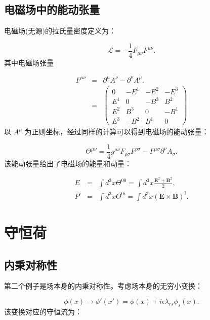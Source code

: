 \documentclass[10pt,UTF8]{ctexart}
\begin{document}
\subsection*{电磁场中的能动张量}
\noindent
电磁场(无源)的拉氏量密度定义为：

\begin{equation}
\mathcal{L}=-\frac{1}{4}F_{\mu\nu}F^{\mu\nu}.
\end{equation}
其中电磁场张量

\begin{eqnarray}
F^{\mu\nu} & = & \partial^{\mu}A^{\nu}-\partial^{\nu}A^{\mu}.\\
 & = & \left(\begin{array}{cccc}
0 & -E^{1} & -E^{2} & -E^{3}\\
E^{1} & 0 & -B^{3} & B^{2}\\
E^{2} & B^{3} & 0 & -B^{1}\\
E^{3} & -B^{2} & B^{1} & 0
\end{array}\right)
\end{eqnarray}
以 $A^{\mu}$ 为正则坐标，经过同样的计算可以得到电磁场的能动张量：

\begin{equation}
\Theta^{\mu\nu}=\frac{1}{4}g^{\mu\nu}F_{\rho\sigma}F^{\rho\sigma}-F^{\mu\sigma}\partial^{\nu}A_{\sigma}.
\end{equation}
该能动张量给出了电磁场的能量和动量：

\begin{eqnarray}
E & = & \int d^{3}x\Theta^{00}=\int d^{3}x\frac{\bm{E}^{2}+\bm{B}^{2}}{2},\\
P^{i} & = & \int d^{3}x\Theta^{0i}=\int d^{3}x\left(\bm{E}\times\bm{B}\right)^{i}.
\end{eqnarray}


\section*{守恒荷}

\subsection*{内秉对称性}
\noindent
第二个例子是场本身的内秉对称性。考虑场本身的无穷小变换： 

\begin{equation}
\phi\left(x\right)\rightarrow\phi'\left(x'\right)=\phi\left(x\right)+i\epsilon\lambda_{rs}\phi_{s}\left(x\right).
\end{equation}
该变换对应的守恒流为：
\end{document}
